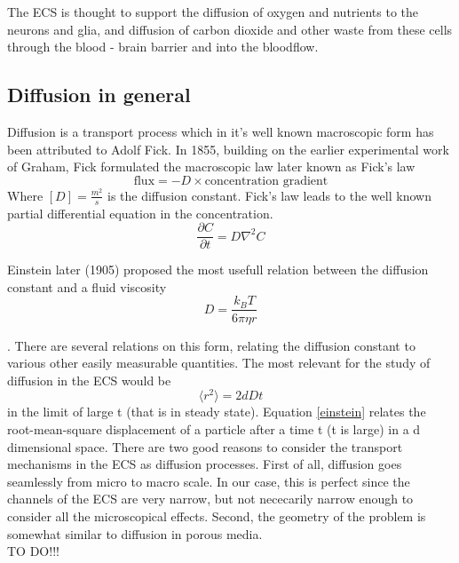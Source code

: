 \documentclass[a4paper,english, 12pt, twoside]{article}
\renewcommand{\d}{\partial}
\begin{document}
The ECS is thought to support the diffusion of oxygen and nutrients to the neurons and glia, and diffusion of carbon dioxide and other waste from these cells through the blood - brain barrier and into the bloodflow. 

\subsection{Diffusion in general}
Diffusion is a transport process which in it's well known macroscopic form has been attributed to Adolf Fick. 
In 1855, building on the earlier experimental work of Graham, Fick formulated the macroscopic law later known as Fick's law
\begin{equation}
 \text{flux} = -D\times\text{concentration gradient}
\end{equation}
Where $[D] = \frac{m^2}{s}$ is the diffusion constant. Fick's law leads to the well known partial differential equation in the concentration.
\begin{equation}\label{diffusion_eq}
 \frac{\d C}{\d t} = D\nabla^2C
\end{equation}

Einstein later (1905) proposed the most usefull relation between the diffusion constant and a fluid viscosity 
\begin{equation}\label{einstein_viscosity}
D = \frac{k_B T}{6\pi \eta r}
\end{equation}

.
There are several relations on this form, relating the diffusion constant to various other easily measurable quantities. 
The most relevant for the study of diffusion in the ECS would be
\begin{equation}\label{einstein}
 \langle r^2\rangle = 2dDt
\end{equation}
in the limit of large t (that is in steady state). Equation \ref{einstein} relates the root-mean-square displacement of a particle after a time t (t is large) in a d dimensional space. 
There are two good reasons to consider the transport mechanisms in the ECS as diffusion processes. 
First of all, diffusion goes seamlessly from micro to macro scale. In our case, this is perfect since the channels of the ECS are very narrow, but not nececarily narrow enough to consider all the microscopical effects. Second, the geometry of the problem is somewhat similar to diffusion in porous media.\\
TO DO!!!
\end{document}
